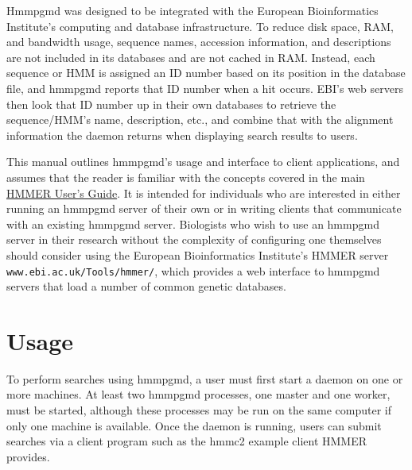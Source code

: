 \documentclass[notoc,justified]{tufte-book}    %
\begin{document}
Hmmpgmd was designed to be integrated with the European Bioinformatics Institute's computing and database infrastructure.  To reduce disk space, RAM, and bandwidth usage, sequence names, accession information, and descriptions are not included in its databases and are not cached in RAM.  Instead, each sequence or HMM is assigned an ID number based on its position in the database file, and hmmpgmd reports that ID number when a hit occurs.  EBI's web servers then look that ID number up in their own databases to retrieve the sequence/HMM's name, description, etc., and combine that with the alignment information the daemon returns when displaying search results to users.

This manual outlines hmmpgmd's usage and interface to client applications, and assumes that the reader is familiar with the concepts covered in the main \underline{HMMER User's Guide}.  It is intended for individuals who are interested in either running an hmmpgmd server of their own or in writing clients that communicate with an existing hmmpgmd server.   Biologists who wish to use an hmmpgmd server in their research without the complexity of configuring one themselves should consider using the European Bioinformatics Institute's HMMER server {\tt www.ebi.ac.uk/Tools/hmmer/}, which provides a web interface to hmmpgmd servers that load a number of common genetic databases.
 

\chapter{Usage}
To perform searches using hmmpgmd, a user must first start a daemon on one or more machines.  At least two hmmpgmd processes, one master and one worker, must be started, although these processes may be run on the same computer if only one machine is available.  Once the daemon is running, users can submit searches via a client program such as the hmmc2 example client HMMER provides.
\end{document}
